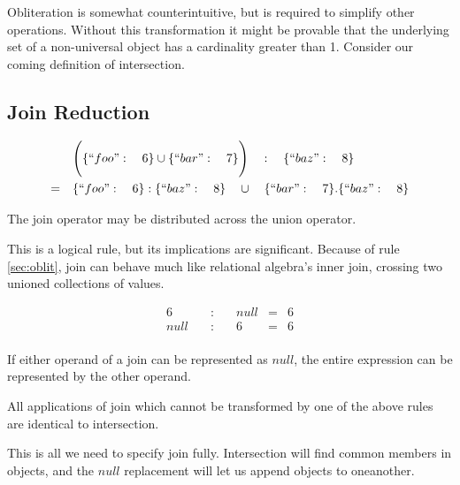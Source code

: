 \documentclass[letterpaper]{article}
\begin{document}
Obliteration is somewhat counterintuitive, but is required to simplify other
operations. Without this transformation it might be provable that the
underlying set of a non-universal object has a cardinality greater than 1.
Consider our coming definition of intersection.

\subsection{Join Reduction}

\begin{prule}
\begin{equation}
\begin{split}
& \Bigg( \{``foo":\quad6\} \cup \{``bar":\quad7\} \Bigg) \quad : \quad
\{``baz":\quad8\} \\
= \quad& \{``foo":\quad6\} : \{``baz":\quad8\} \quad \cup \quad \{``bar":\quad7\}
 . \{``baz":\quad8\}
\end{split}
\end{equation}

The join operator may be distributed across the union operator.
\end{prule}

This is a logical rule, but its implications are significant. Because of
rule \ref{sec:oblit}, join can behave much like relational algebra's inner join,
crossing two unioned collections of values.

\begin{prule}
\begin{equation}
\begin{array}{rclcl}
6 \quad&:&\quad null & = & 6 \\
null \quad&:&\quad 6 & = & 6 \\
\end{array}
\end{equation}
\end{prule}

If either operand of a join can be represented as \(null\), the entire
expression can be represented by the other operand.

\begin{prule}
All applications of join which cannot be transformed by one of the above rules
are identical to intersection.
\end{prule}

This is all we need to specify join fully. Intersection will find common
members in objects, and the \(null\) replacement will let us append objects to
oneanother.
\end{document}
